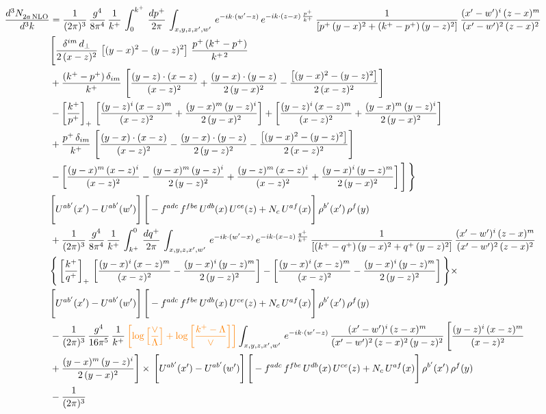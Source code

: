 \documentclass[9pt]{article}
\numberwithin{equation}{section}
\begin{document}
\begin{align}
    \frac{d^{3}N_{2a\,\rm NLO}^{\rm}}{d^{3}k}  & =  \frac{1}{(2\pi)^{3}}\, \frac{g^{4}}{8\pi^{4}}\,\frac{1}{k^{+}}\,\int_{0}^{k^{+}}\, \frac{dp^{+}}{2\pi}\,\int_{x,y,z,x',w'}\, e^{-ik\cdot(w'-z)}\,e^{-ik\cdot (z-x)\,\frac{p^{+}}{k^{+}}}\,\frac{1}{\left[p^{+}\,(y-x)^{2}+(k^{+}-p^{+})\,(y-z)^{2}\right]}\, \frac{(x'-w')^{i}\,(z-x)^{m}}{(x'-w')^{2}\,(z-x)^{2}} \notag \\ & \Bigg[\frac{\delta^{im}\,d_{\perp}}{2\,(x-z)^{2}}\,\left[(y-x)^{2}-(y-z)^{2}\right]\,\frac{p^{+}\,(k^{+}-p^{+})}{k^{+\,2}}\notag \\ & +\frac{(k^{+}-p^{+})\,\delta_{im}}{k^{+}}\,\left[\frac{(y-z)\cdot (x-z)}{(x-z)^{2}}+\frac{(y-x)\cdot (y-z)}{2\,(y-x)^{2}}-\frac{\left[(y-x)^{2}-(y-z)^{2}\right]}{2\,(x-z)^{2}}\right]\notag \\ & -\left[\frac{k^{+}}{p^{+}}\right]_{+}\,\left[\frac{(y-z)^{i}\,(x-z)^{m}}{(x-z)^{2}}+\frac{(y-x)^{m}\,(y-z)^{i}}{2\,(y-x)^{2}}\right]+ \left[\frac{(y-z)^{i}\,(x-z)^{m}}{(x-z)^{2}}+\frac{(y-x)^{m}\,(y-z)^{i}}{2\,(y-x)^{2}}\right]\notag \\ & +\frac{p^{+}\,\delta_{im}}{k^{+}}\,\left[\frac{(y-x)\cdot (x-z)}{(x-z)^{2}}-\frac{(y-x)\cdot (y-z)}{2\,(y-z)^{2}}-\frac{\left[(y-x)^{2}-(y-z)^{2}\right]}{2\,(x-z)^{2}}\right]\notag \\ &-\left[\frac{(y-x)^{m}\,(x-z)^{i}}{(x-z)^{2}}-\frac{(y-x)^{m}\,(y-z)^{i}}{2\,(y-z)^{2}}+\frac{(y-z)^{m}\,(x-z)^{i}}{(x-z)^{2}}+\frac{(y-x)^{i}\,(y-z)^{m}}{2\,(y-x)^{2}}\right]\Bigg]\,\Bigg\} \notag \\ & \Bigg[U^{ab'}(x')-U^{ab'}(w')\Bigg]\,\Bigg[-f^{adc}\,f^{fbe}\,U^{db}(x)\,U^{ce}(z)+N_{c}\,U^{af}(x)\Bigg]\,\rho^{b'}(x')\,\rho^{f}(y)\notag \\ & + \frac{1}{(2\pi)^{3}}\,\frac{g^{4}}{8\pi^{4}}\,\frac{1}{k^{+}}\, \int^{0}_{k^{+}}\, \frac{dq^{+}}{2\pi} \,  \int_{x,y,z,x',w'}\,e^{-ik\cdot(w'-x)}\,e^{-ik\cdot (x-z)\,\frac{q^{+}}{k^{+}}}\,\frac{1}{\left[(k^{+}-q^{+})\,(y-x)^{2}+q^{+}\,(y-z)^{2}\right]}\, \frac{(x'-w')^{i}\,(z-x)^{m}}{(x'-w')^{2}\,(z-x)^{2}} \notag \\ &\Bigg\{\left[\frac{k^{+}}{q^{+}}\right]_{+}\,\left[\frac{(y-x)^{i}\,(x-z)^{m}}{(x-z)^{2}}-\frac{(y-x)^{i}\,(y-z)^{m}}{2\,(y-z)^{2}}\right] -\left[\frac{(y-x)^{i}\,(x-z)^{m}}{(x-z)^{2}}-\frac{(y-x)^{i}\,(y-z)^{m}}{2\,(y-z)^{2}}\right]\Bigg\}\times\,\notag \\ & \Bigg[U^{ab'}(x')-U^{ab'}(w')\Bigg]\,\Bigg[-f^{adc}\,f^{fbe}\,U^{db}(x)\,U^{ce}(z)+N_{c}\,U^{af}(x)\Bigg]\,\rho^{b'}(x')\,\rho^{f}(y)\notag \\ & - \frac{1}{(2\pi)^{3}}\, \frac{g^{4}}{16\pi^{5}}\,\frac{1}{k^{+}}\,{\color{orange}\left[\log{\left[\frac{\vee}{\Lambda}\right]}+\log{\left[\frac{k^{+}-\Lambda}{\vee}\right]}\right]} \int_{x,y,z,x',w'}\,e^{-ik\cdot(w'-z)}\, \frac{(x'-w')^{i}\,(z-x)^{m}}{(x'-w')^{2}\,(z-x)^{2}\, (y-z)^{2}}\,\Bigg[\frac{(y-z)^{i}\,(x-z)^{m}}{(x-z)^{2}}\notag \\ & +\frac{(y-x)^{m}\,(y-z)^{i}}{2\,(y-x)^{2}}\Bigg]\times\, \Bigg[U^{ab'}(x')-U^{ab'}(w')\Bigg]\,\Bigg[-f^{adc}\,f^{fbe}\,U^{db}(x)\,U^{ce}(z)+N_{c}\,U^{af}(x)\Bigg]\,\rho^{b'}(x')\,\rho^{f}(y)\notag \\ & - \frac{1}{(2\pi)^{3}}\, 
\end{align}
\end{document}

